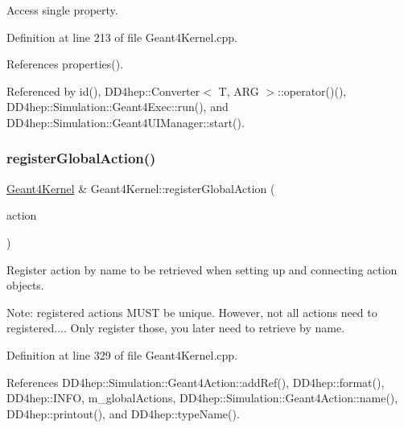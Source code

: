 Access single property. 



Definition at line 213 of file Geant4\+Kernel.\+cpp.



References properties().



Referenced by id(), D\+D4hep\+::\+Converter$<$ T, A\+R\+G $>$\+::operator()(), D\+D4hep\+::\+Simulation\+::\+Geant4\+Exec\+::run(), and D\+D4hep\+::\+Simulation\+::\+Geant4\+U\+I\+Manager\+::start().

\hypertarget{class_d_d4hep_1_1_simulation_1_1_geant4_kernel_a8792d3d0db403a52fe6495456b45c97a}{}\label{class_d_d4hep_1_1_simulation_1_1_geant4_kernel_a8792d3d0db403a52fe6495456b45c97a} 
\subsubsection{\texorpdfstring{register\+Global\+Action()}{registerGlobalAction()}}
{\footnotesize\ttfamily \hyperlink{class_d_d4hep_1_1_simulation_1_1_geant4_kernel}{Geant4\+Kernel} \& Geant4\+Kernel\+::register\+Global\+Action (\begin{DoxyParamCaption}\item[{\hyperlink{class_d_d4hep_1_1_simulation_1_1_geant4_action}{Geant4\+Action} $\ast$}]{action }\end{DoxyParamCaption})}



Register action by name to be retrieved when setting up and connecting action objects. 

Note\+: registered actions M\+U\+ST be unique. However, not all actions need to registered.... Only register those, you later need to retrieve by name. 

Definition at line 329 of file Geant4\+Kernel.\+cpp.



References D\+D4hep\+::\+Simulation\+::\+Geant4\+Action\+::add\+Ref(), D\+D4hep\+::format(), D\+D4hep\+::\+I\+N\+FO, m\+\_\+global\+Actions, D\+D4hep\+::\+Simulation\+::\+Geant4\+Action\+::name(), D\+D4hep\+::printout(), and D\+D4hep\+::type\+Name().



